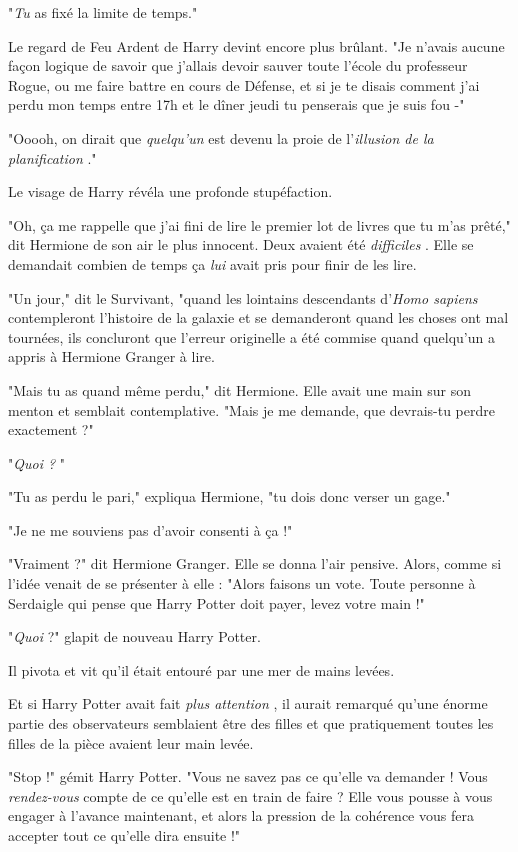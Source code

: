"\emph{Tu } as fixé la limite de temps."

Le regard de Feu Ardent de Harry devint encore plus brûlant. "Je n'avais aucune façon logique de savoir que j'allais devoir sauver toute l'école du professeur Rogue, ou me faire battre en cours de Défense, et si je te disais comment j'ai perdu mon temps entre 17h et le dîner jeudi tu penserais que je suis fou -"

"Ooooh, on dirait que \emph{quelqu'un}  est devenu la proie de l'\emph{illusion de la planification} ."

Le visage de Harry révéla une profonde stupéfaction.

"Oh, ça me rappelle que j'ai fini de lire le premier lot de livres que tu m'as prêté," dit Hermione de son air le plus innocent. Deux avaient été \emph{difficiles} . Elle se demandait combien de temps ça \emph{lui}  avait pris pour finir de les lire.

"Un jour," dit le Survivant, "quand les lointains descendants d'\emph{Homo sapiens } contempleront l'histoire de la galaxie et se demanderont quand les choses ont mal tournées, ils concluront que l'erreur originelle a été commise quand quelqu'un a appris à Hermione Granger à lire.

"Mais tu as quand même perdu," dit Hermione. Elle avait une main sur son menton et semblait contemplative. "Mais je me demande, que devrais-tu perdre exactement ?"

"\emph{Quoi ?} "

"Tu as perdu le pari," expliqua Hermione, "tu dois donc verser un gage."

"Je ne me souviens pas d'avoir consenti à ça !"

"Vraiment ?" dit Hermione Granger. Elle se donna l'air pensive. Alors, comme si l'idée venait de se présenter à elle : "Alors faisons un vote. Toute personne à Serdaigle qui pense que Harry Potter doit payer, levez votre main !"

"\emph{Quoi } ?" glapit de nouveau Harry Potter.

Il pivota et vit qu'il était entouré par une mer de mains levées.

Et si Harry Potter avait fait \emph{plus attention} , il aurait remarqué qu'une énorme partie des observateurs semblaient être des filles et que pratiquement toutes les filles de la pièce avaient leur main levée.

"Stop !" gémit Harry Potter. "Vous ne savez pas ce qu'elle va demander ! Vous \emph{rendez-vous}  compte de ce qu'elle est en train de faire ? Elle vous pousse à vous engager à l'avance maintenant, et alors la pression de la cohérence vous fera accepter tout ce qu'elle dira ensuite !"

